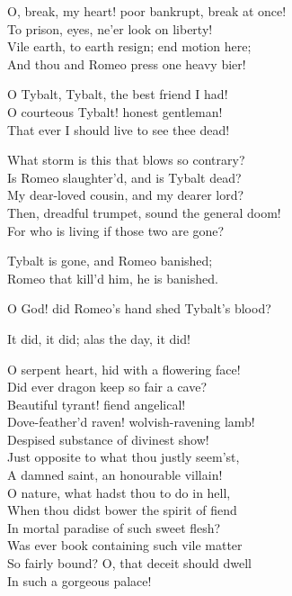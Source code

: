 \begin{speech}
O, break, my heart! poor bankrupt, break at once!
\\
To prison, eyes, ne'er look on liberty! \\
Vile earth, to earth resign; end motion here; \\
And thou and Romeo press one heavy bier! \\
\end{speech}
\begin{speech}
O Tybalt, Tybalt, the best friend I had! \\
O courteous Tybalt! honest gentleman! \\
That ever I should live to see thee dead! \\
\end{speech}
\begin{speech}
What storm is this that blows so contrary? \\
Is Romeo slaughter'd, and is Tybalt dead? \\
My dear-loved cousin, and my dearer lord? \\
Then, dreadful trumpet, sound the general doom! \\
For who is living if those two are gone? \\
\end{speech}
\begin{speech}
Tybalt is gone, and Romeo banished; \\
Romeo that kill'd him, he is banished. \\
\end{speech}
\begin{speech}
O God! did Romeo's hand shed Tybalt's blood? \\
\end{speech}
\begin{speech}
It did, it did; alas the day, it did! \\
\end{speech}
\begin{speech}
O serpent heart, hid with a flowering face! \\
Did ever dragon keep so fair a cave? \\
Beautiful tyrant! fiend angelical! \\
Dove-feather'd raven! wolvish-ravening lamb! \\
Despised substance of divinest show! \\
Just opposite to what thou justly seem'st, \\
A damned saint, an honourable villain! \\
O nature, what hadst thou to do in hell, \\
When thou didst bower the spirit of fiend \\
In mortal paradise of such sweet flesh? \\
Was ever book containing such vile matter \\
So fairly bound?   O, that deceit should dwell \\
In such a gorgeous palace! \\
\end{speech}
